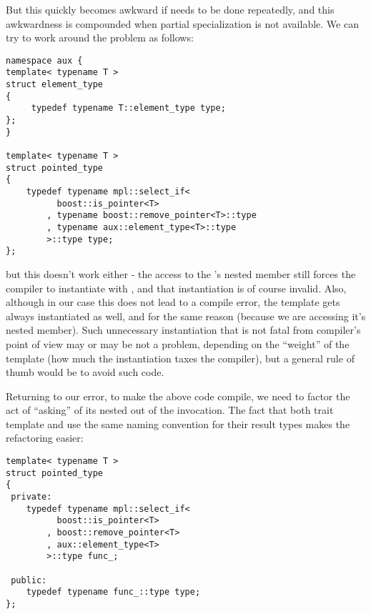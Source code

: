 \documentclass{kapproc}
\begin{document}
But this quickly becomes awkward if needs to be done repeatedly, and
this awkwardness is compounded when partial specialization is not
available. We can try to work around the problem as follows:

{\small
\begin{codesamp}\begin{verbatim}
namespace aux {
template< typename T >
struct element_type
{
     typedef typename T::element_type type;
};
}

template< typename T >
struct pointed_type
{
    typedef typename mpl::select_if<
          boost::is_pointer<T>
        , typename boost::remove_pointer<T>::type
        , typename aux::element_type<T>::type
        >::type type;
};
\end{verbatim}
\end{codesamp}
}

but this doesn't work either - the access to the 
's nested  member still 
forces the compiler to instantiate 
with , and that instantiation is of course 
invalid. Also, although in our case this does not lead to a 
compile error, the  template 
gets always instantiated as well, and for the same reason 
(because we are accessing it's nested  member). 
Such unnecessary instantiation that is not fatal from 
compiler's point of view may or may be not a problem, 
depending on the ``weight'' of the template (how much the 
instantiation taxes the compiler), but a general rule of 
thumb would be to avoid such code.

Returning to our error, to make the above code compile, we 
need to factor the act of ``asking'' 
of its nested  out of the  
invocation. The fact that both 
trait template and  use the same 
naming convention for their result types makes the refactoring 
easier:

{\small
\begin{codesamp}\begin{verbatim}
template< typename T >
struct pointed_type
{
 private:
    typedef typename mpl::select_if<
          boost::is_pointer<T>
        , boost::remove_pointer<T>
        , aux::element_type<T>
        >::type func_;

 public:
    typedef typename func_::type type;
};
\end{verbatim}
\end{codesamp}
}
\end{document}
